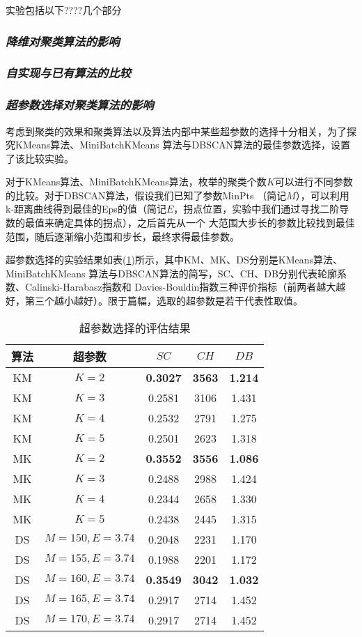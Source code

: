 \documentclass{acm_proc_article-sp}
\begin{document}
实验包括以下????几个部分

\subsubsection{\textit{降维对聚类算法的影响}}

\subsubsection{\textit{自实现与已有算法的比较}}

\subsubsection{\textit{超参数选择对聚类算法的影响}}

考虑到聚类的效果和聚类算法以及算法内部中某些超参数的选择十分相关，为了探究KMeans算法、MiniBatchKMeans
算法与DBSCAN算法的最佳参数选择，设置了该比较实验。

对于KMeans算法、MiniBatchKMeans算法，枚举的聚类个数$K$可以进行不同参数的比较。对于DBSCAN算法，假设我们已知了参数MinPts
（简记$M$），可以利用k-距离曲线得到最佳的Eps的值（简记$E$，拐点位置，实验中我们通过寻找二阶导数的最值来确定具体的拐点），之后首先从一个
大范围大步长的参数比较找到最佳范围，随后逐渐缩小范围和步长，最终求得最佳参数。

超参数选择的实验结果如表(\ref{ARG})所示，其中KM、MK、DS分别是KMeans算法、MiniBatchKMeans
算法与DBSCAN算法的简写，SC、CH、DB分别代表轮廓系数、Calinski-Harabasz指数和
Davies-Bouldin指数三种评价指标（前两者越大越好，第三个越小越好）。限于篇幅，选取的超参数是若干代表性取值。

\begin{table}[!htb]
\centering
\caption{超参数选择的评估结果}
\begin{tabular}{@{}ccccc@{}}\toprule
算法     & 超参数 & $\mathit{SC}$ & $\mathit{CH}$ & $\mathit{DB}$  \\ \midrule
KM & $K=2$   & \textbf{0.3027} & \textbf{3563} & \textbf{1.214}\\
KM & $K=3$   & 0.2581 & 3106 & 1.431\\
KM & $K=4$   & 0.2532 & 2791 & 1.275\\
KM & $K=5$   & 0.2501 & 2623 & 1.318\\\midrule
MK & $K=2$   & \textbf{0.3552} & \textbf{3556} & \textbf{1.086}\\
MK & $K=3$   & 0.2488 & 2988 & 1.424\\
MK & $K=4$   & 0.2344 & 2658 & 1.330\\
MK & $K=5$   & 0.2438 & 2445 & 1.315\\\midrule  
DS & $M=150,E=3.74$    & 0.2048 & 2231 & 1.170\\
DS & $M=155,E=3.74$    & 0.1988 & 2201 & 1.172\\
DS & $M=160,E=3.74$    & \textbf{0.3549} & \textbf{3042} & \textbf{1.032}\\
DS & $M=165,E=3.74$    & 0.2917 & 2714 & 1.452\\
DS & $M=170,E=3.74$    & 0.2917 & 2714 & 1.452\\\bottomrule
\end{tabular}
\label{ARG}
\end{table}
\end{document}
